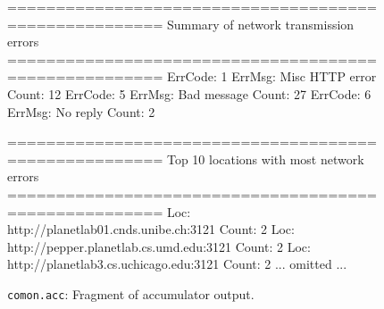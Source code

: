  



\begin{figure}[t]
\centering
\begin{scodebox}
======================================================
Summary of network transmission errors
======================================================
ErrCode: 1      ErrMsg: Misc HTTP error Count: 12
ErrCode: 5      ErrMsg: Bad message     Count: 27
ErrCode: 6      ErrMsg: No reply        Count: 2

======================================================
Top 10 locations with most network errors
======================================================
Loc: http://planetlab01.cnds.unibe.ch:3121    Count: 2
Loc: http://pepper.planetlab.cs.umd.edu:3121  Count: 2
Loc: http://planetlab3.cs.uchicago.edu:3121   Count: 2
... omitted ...
\end{scodebox}
\caption{\texttt{comon.acc}: Fragment of accumulator output.} \label{fig:acc}
\end{figure} 



